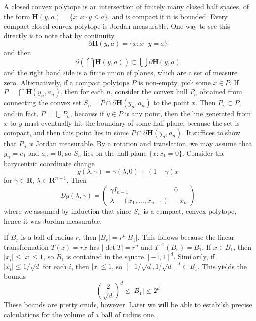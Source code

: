\begin{example}
  A closed convex polytope is an intersection of finitely many closed half spaces, of the form $\mathbf{H}(y,a) = \{ x: x \cdot y \leq a \}$, and is compact if it is bounded. Every compact closed convex polytope is Jordan measurable. One way to see this directly is to note that by continuity,
  \[ \partial \mathbf{H}(y,a) = \{ x: x \cdot y = a \} \]
  and then
  \[ \partial \left(\bigcap \mathbf{H}(y,a)\right) \subset \bigcup \partial \mathbf{H}(y,a) \]
  and the right hand side is a finite union of planes, which are a set of measure zero. Alternatively, if a compact polytope $P$ is non-empty, pick some $x \in P$. If $P = \bigcap \mathbf{H}(y_n,a_n)$, then for each $n$, consider the convex hull $P_n$ obtained from connecting the convex set $S_n = P \cap \partial \mathbf{H}(y_n,a_n)$ to the point $x$. Then $P_n \subset P$, and in fact, $P = \bigcup P_n$, because if $y \in P$ is any point, then the line generated from $x$ to $y$ must eventually hit the boundary of some half plane, because the set is compact, and then this point lies in some $P \cap \partial \mathbf{H}(y_n,a_n)$. It suffices to show that $P_n$ is Jordan measurable. By a rotation and translation, we may assume that $y_n = e_1$ and $a_n = 0$, so $S_n$ lies on the half plane $\{ x : x_1 = 0 \}$. Consider the barycentric coordinate change
  \[ g(\lambda, \gamma) = \gamma (\lambda, 0) + (1 - \gamma) x \]
  for $\gamma \in \mathbf{R}$, $\lambda \in \mathbf{R}^{n-1}$. Then
  \[ Dg(\lambda, \gamma) = \begin{pmatrix} \gamma I_{n-1} & 0 \\ \lambda - (x_1,\dots,x_{n-1}) & -x_n \end{pmatrix} \]
  where we assumed by induction that since $S_n$ is a compact, convex polytope, hence it was Jordan measurable.
\end{example}

\begin{example}
  If $B_r$ is a ball of radius $r$, then $|B_r| = r^n |B_1|$. This follows because the linear transformation $T(x) = rx$ has $|\det T| = r^n$ and $T^{-1}(B_r) = B_1$. If $x \in B_1$, then $|x_i| \leq |x| \leq 1$, so $B_1$ is contained in the square $[-1,1]^d$. Similarily, if $|x_i| \leq 1/\sqrt{d}$ for each $i$, then $|x| \leq 1$, so $[-1/\sqrt{d},1/\sqrt{d}]^d \subset B_1$. This yields the bounds
  \[ \left( \frac{2}{\sqrt{d}} \right)^d \leq |B_1| \leq 2^d \]
  These bounds are pretty crude, however. Later we will be able to estabilsh precise calculations for the volume of a ball of radius one.
\end{example}

